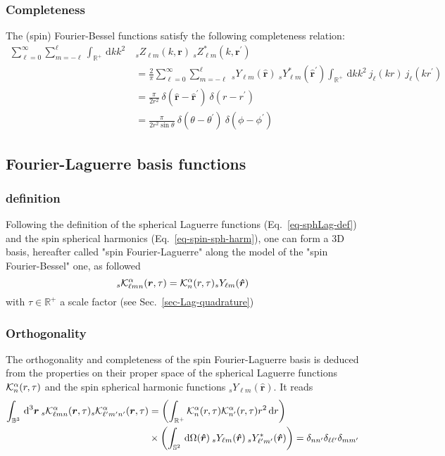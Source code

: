 \documentclass[a4paper,11pt]{article}
\newcommand{\realsnn}{\ensuremath{{\mathbb{R}^{+}}}}
\newcommand{\ball}{\ensuremath{{\mathbb{B}^3}}}
\newcommand{\sphere}{\ensuremath{{\mathbb{S}^2}}}
\newcommand{\dx}{\ensuremath{\mathrm{\,d}}}
\newcommand{\rvec}{{\boldsymbol{r}}}
\newcommand{\rang}{{\boldsymbol{\hat{r}}}}
\newcommand{\rlen}{{r}}
\begin{document}
\subsubsection{Completeness}

The (spin) Fourier-Bessel functions satisfy the following completeness relation:
\begin{align}  
  \sum_{\ell=0}^\infty \sum_{m=-\ell}^{\ell}
  \int_{\realsnn} \dx k k^2 \:
  & {}_s Z_{\ell m}(k, \rvec) \:
  {}_s Z_{\ell m}^\ast(k, \rvec^\prime) \\ 
  & =   
  \frac{2}{\pi} \sum_{\ell=0}^\infty \sum_{m=-\ell}^{\ell} \:
  {}_s Y_{\ell m}(\rang) \:
  {}_s Y_{\ell m}^\ast(\rang^\prime) 
  \int_{\realsnn} \dx k k^2 \: j_\ell(k \rlen) \: j_\ell(k \rlen^\prime) \\
  & = 
  \frac{\pi}{2\rlen^2} \:
  \delta(\rang-\rang^\prime) \:
  \delta(\rlen-\rlen^\prime)\\
  & = 
  \frac{\pi}{2\rlen^2\sin\theta} \:
  \delta(\theta-\theta^\prime) \:
  \delta(\phi-\phi^\prime)
\end{align}


\subsection{Fourier-Laguerre basis functions}
\label{sec-FLag-basis}
\subsubsection{definition}
%
Following the definition of the spherical Laguerre functions (Eq.~\ref{eq-sphLag-def}) and the spin spherical harmonics (Eq.~\ref{eq-spin-sph-harm}), one can form a 3D basis, hereafter called "spin Fourier-Laguerre" along the model of the "spin Fourier-Bessel" one, as followed 
\begin{equation}
{}_s{\cal K}_{\ell m n}^\alpha(\rvec, \tau) =  {\cal K}_n^\alpha(r, \tau) {}_sY_{\ell m}(\rang) 
\end{equation}
with $\tau  \in \realsnn$ a scale factor (see Sec.~\ref{sec-Lag-quadrature})
%
\subsubsection{Orthogonality}
%
The orthogonality and completeness of the spin Fourier-Laguerre basis is deduced from the properties on their proper space of the spherical Laguerre functions ${\cal K}_n^\alpha(r, \tau)$ and the spin spherical harmonic functions ${}_sY_{\ell m}(\rang)$. It reads
\begin{align}
\int_\ball \dx^3 \rvec \: {}_s{\cal K}_{\ell m n}^\alpha(\rvec, \tau) {}_s{\cal K}_{\ell^\prime m^\prime n^\prime}^\alpha(\rvec, \tau) &= \left( \int_\realsnn  {\cal K}^\alpha_n(r, \tau) {\cal K}^\alpha_{n^\prime}(r, \tau) r^2 \dx r \right)\nonumber \\  
& \times \left( \int_\sphere \dx \Omega(\rang) \:
  {}_s Y_{\ell m}(\rang) \:
  {}_s Y_{\ell^\prime m^\prime}^\ast(\rang) \right) 
  = \delta_{n n^\prime}\delta_{\ell \ell^\prime}\delta_{m m^\prime}
\end{align}
\end{document}
